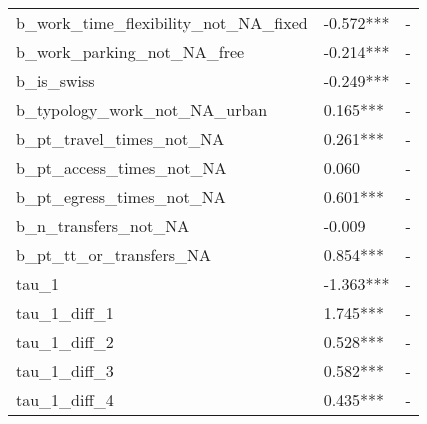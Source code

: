 \begin{tabular}{lll}
b_work_time_flexibility_not_NA_fixed & -0.572*** & - \\
b_work_parking_not_NA_free & -0.214*** & - \\
b_is_swiss & -0.249*** & - \\
b_typology_work_not_NA_urban & 0.165*** & - \\
b_pt_travel_times_not_NA & 0.261*** & - \\
b_pt_access_times_not_NA & 0.060 & - \\
b_pt_egress_times_not_NA & 0.601*** & - \\
b_n_transfers_not_NA & -0.009 & - \\
b_pt_tt_or_transfers_NA & 0.854*** & - \\
tau_1 & -1.363*** & - \\
tau_1_diff_1 & 1.745*** & - \\
tau_1_diff_2 & 0.528*** & - \\
tau_1_diff_3 & 0.582*** & - \\
tau_1_diff_4 & 0.435*** & - \\
\bottomrule
\end{tabular}
